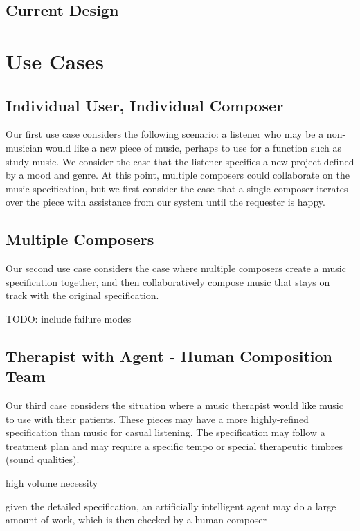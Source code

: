 \documentclass[final,authoryear,11pt,times]{elsarticle}
\begin{document}
\subsection{Current Design}


\section{Use Cases}

\subsection{Individual User, Individual Composer}

Our first use case considers the following scenario: a listener who may be a non-musician would like a new piece of music, perhaps to use for a function such as study music. We consider the case that the listener specifies a new project defined by a mood and genre. At this point, multiple composers could collaborate on the music specification, but we first consider the case that a single composer iterates over the piece with assistance from our system until the requester is happy.


\subsection{Multiple Composers}

Our second use case considers the case where multiple composers create a music specification together, and then collaboratively compose music that stays on track with the original specification.

TODO: include failure modes

\subsection{Therapist with Agent - Human Composition Team}

Our third case considers the situation where a music therapist would like music to use with their patients. These pieces may have a more highly-refined specification than music for casual listening. The specification may follow a treatment plan and may require a specific tempo or special therapeutic timbres (sound qualities).

high volume necessity

given the detailed specification, an artificially intelligent agent may do a large amount of work, which is then checked by a human composer
\end{document}
